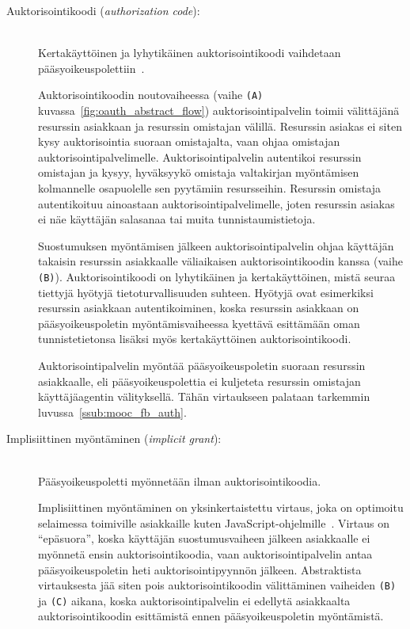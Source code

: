 \documentclass[finnish,gradu]{tktltiki}
\begin{document}
  \begin{description}
  \item[Auktorisointikoodi (\emph{authorization code}):] \hfill \\
  Kertakäyttöinen ja lyhytikäinen auktorisointikoodi vaihdetaan pääsyoikeuspolettiin~\cite{ietf_oauth2}.

  Auktorisointikoodin noutovaiheessa (vaihe \verb!(A)! kuvassa~\ref{fig:oauth_abstract_flow}) auktorisointipalvelin toimii välittäjänä resurssin asiakkaan ja resurssin omistajan välillä. Resurssin asiakas ei siten kysy auktorisointia suoraan omistajalta, vaan ohjaa omistajan auktorisointipalvelimelle. Auktorisointipalvelin autentikoi resurssin omistajan ja kysyy, hyväksyykö omistaja valtakirjan myöntämisen kolmannelle osapuolelle sen pyytämiin resursseihin. Resurssin omistaja autentikoituu ainoastaan auktorisointipalvelimelle, joten resurssin asiakas ei näe käyttäjän salasanaa tai muita tunnistaumistietoja.

  Suostumuksen myöntämisen jälkeen auktorisointipalvelin ohjaa käyttäjän takaisin resurssin asiakkaalle väliaikaisen auktorisointikoodin kanssa (vaihe \verb!(B)!). Auktorisointikoodi on lyhytikäinen ja kertakäyttöinen, mistä seuraa tiettyjä hyötyjä tietoturvallisuuden suhteen. Hyötyjä ovat esimerkiksi resurssin asiakkaan autentikoiminen, koska resurssin asiakkaan on pääsyoikeuspoletin myöntämisvaiheessa kyettävä esittämään oman tunnistetietonsa lisäksi myös kertakäyttöinen auktorisointikoodi.

  Auktorisointipalvelin myöntää pääsyoikeuspoletin suoraan resurssin asiakkaalle, eli pääsyoikeuspolettia ei kuljeteta resurssin omistajan käyttäjäagentin välityksellä. Tähän virtaukseen palataan tarkemmin luvussa~\ref{ssub:mooc_fb_auth}.

  \item[Implisiittinen myöntäminen (\emph{implicit grant}):] \hfill \\
  Pääsyoikeuspoletti myönnetään ilman auktorisointikoodia.

  Implisiittinen myöntäminen on yksinkertaistettu virtaus, joka on optimoitu selaimessa toimiville asiakkaille kuten JavaScript-ohjelmille~\cite{ietf_oauth2}. Virtaus on ``epäsuora'', koska käyttäjän suostumusvaiheen jälkeen asiakkaalle ei myönnetä ensin auktorisointikoodia, vaan auktorisointipalvelin antaa pääsyoikeuspoletin heti auktorisointipyynnön jälkeen. Abstraktista virtauksesta jää siten pois auktorisointikoodin välittäminen vaiheiden \verb!(B)! ja \verb!(C)! aikana, koska auktorisointipalvelin ei edellytä asiakkaalta auktorisointikoodin esittämistä ennen pääsyoikeuspoletin myöntämistä.


\end{description}
\end{document}
